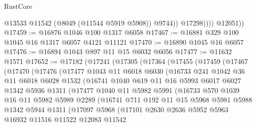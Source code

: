 \begin{lexlean}{RustCore}
\begin{coremodule}
                    @13533
                    @11542
                    (@8049 (@11544 @5919 @5908))
                    @9744))
                @17298))))
        @12051))
@17459 := @16876 @1046 @100 @1317 @6058
@17467 := @16881 @329 @100 @1045 @16 @1317 @6057 @4121 @11121
@17470 := @16890 @1045 @16 @6057
@17476 := @16894 @1043 @897 @11 @15 @6032 @6056
@17477 := @11632 @1571
@17652 := @17182
    (@17241
      (@17305
        (@17364
          (@17455
            (@17459
              (@17467
                (@17470
                  (@17476
                    (@17477
                      @1043
                      @11
                      @6018
                      @6030
                      (@16733
                        @241
                        @1042
                        @36
                        @11
                        @6018
                        @6028
                        @1532
                        (@16741
                          @1040
                          @619
                          @11
                          @16
                          @5993
                          @6017
                          @6027
                          @1342
                          @5936
                          @1311
                          (@17477
                            @1040
                            @11
                            @5982
                            @5991
                            (@16733
                              @570
                              @1039
                              @16
                              @11
                              @5982
                              @5989
                              @2289
                              (@16741
                                @711
                                @192
                                @11
                                @15
                                @5968
                                @5981
                                @5988
                                @1342
                                @5944
                                @1311
                                (@17097
                                  @5968
                                  (@17101
                                    @2630
                                    @2636
                                    @5952
                                    @5963
                                    @16932
                                    @11516
                                    @11522
                                    @12083
                                    @11542

\end{coremodule}
\end{lexlean}
